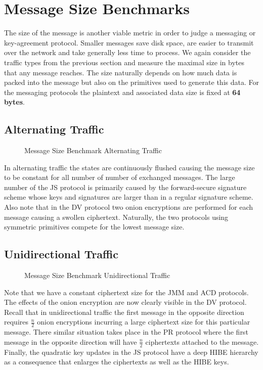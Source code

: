\documentclass[11pt,a4paper,twoside,openright,bibliography=totoc]{scrbook}
\begin{document}
\section{Message Size Benchmarks}
\label{sec:ciph-size-benchm}

The size of the message is another viable metric in order to
judge a messaging or key-agreement protocol. Smaller messages save disk space,
are easier to transmit over the network and take generally
less time to process. We again consider the traffic
types from the previous section and measure the maximal
size in bytes that any message reaches. The size
naturally depends on how much data is packed into the message
but also on the primitives used to generate this data.
For the messaging protocols the plaintext and associated
data size is fixed at \textbf{64 bytes}.

\clearpage

\subsection{Alternating Traffic}
\label{sec:alternating-traffic-1}

\begin{figure}[H]
  \centering
   
  \caption{Message Size Benchmark Alternating Traffic}
  \label{fig:msg-size}
\end{figure}

In alternating traffic the states are continuously flushed causing the
message size to be constant for all number of number
of exchanged messages. The large number of the JS protocol
is primarily caused by the forward-secure signature scheme
whose keys and signatures are larger than in a regular signature scheme.
Also note that in the DV protocol two onion encryptions
are performed for each message causing a swollen
ciphertext. Naturally, the two protocols using
symmetric primitives compete for the lowest message size.

\subsection{Unidirectional Traffic}
\label{sec:unid-traff-1}

\begin{figure}[H]
  \centering
   
  \caption{Message Size Benchmark Unidirectional Traffic}
  \label{fig:msg-size-uni}
\end{figure}

Note that we have a constant ciphertext size for the JMM and ACD
protocols.
The effects of the onion encryption are now clearly visible
in the DV protocol. Recall that in unidirectional traffic
the first message in the opposite direction requires $\frac{n}{2}$
onion encryptions incurring a large ciphertext size for
this particular message.
There similar situation takes place in the PR protocol where
the first message in the opposite direction
will have $\frac{n}{2}$ ciphertexts attached to the message.
Finally, the quadratic key updates in the JS protocol
have a deep HIBE hierarchy as a consequence that
enlarges the ciphertexts as well as the HIBE
keys.
\end{document}
